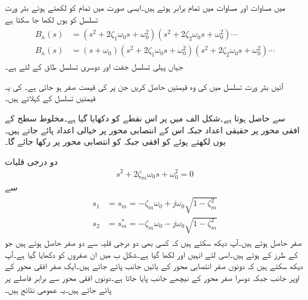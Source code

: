   میں مساوات  اور مساوات  میں تمام  برابر ہوتے ہیں۔ایسی صورت میں تمام  کو  لکھتے ہوئے بٹر ورت تسلسل کو یوں لکھا جا سکتا ہے
\begin{gather}
\begin{aligned}\label{مساوات_تعددی_ردعمل_بٹرورت_تسلسل}
B_n(s)&=\left(s^2+2 \zeta_1 \omega_0 s+\omega_0^2 \right)\left(s^2+2 \zeta_2 \omega_0 s+\omega_0^2 \right) \cdots\\
B_n(s)&=\left(s+\omega_0 \right)\left(s^2+2 \zeta_1 \omega_0 s+\omega_0^2 \right)\left(s^2+2 \zeta_2 \omega_0 s+\omega_0^2 \right) \cdots
\end{aligned}
\end{gather}
جہاں پہلی تسلسل جفت  اور دوسری تسلسل طاق  کے لئے ہے۔

آئیں بٹر ورت تسلسل میں  کی وہ قیمتیں حاصل کریں جن پر  کی قیمت صفر ہو جاتی  ہے۔ کی یہ قیمتیں تسلسل کے  کہلاتے ہیں۔

 سے  حاصل ہوتا ہے۔شکل  الف میں  پر اس نقطے کو دکھایا گیا ہے۔مخلوط سطح کے افقی محور پر حقیقی اعداد جبکہ اس کے انتصابی محور پر خیالی اعداد پائے جاتے ہیں۔یوں  لکھتے ہوئے  کو افقی جبکہ  کو انتصابی محور پر رکھا جائے گا۔

دو درجی قلیات
\begin{align}\label{مساوات_تعددی_ردعمل_دو_درجی_عمومی_جزو}
s^2+2 \zeta_m \omega_0 s +\omega_0^2=0
\end{align}
سے
\begin{gather}
\begin{aligned}
s_1&=s_m =-\zeta_m \omega_0 + j \omega_0 \sqrt{1-\zeta_m^2}\\
s_2&=s_m^* =-\zeta_m \omega_0 - j \omega_0 \sqrt{1-\zeta_m^2}
\end{aligned}
\end{gather}
صفر حاصل ہوتے ہیں۔آپ دیکھ سکتے ہیں کہ کسی بھی دو درجی قلیہ سے دو صفر حاصل ہوتے ہیں جو  کے طرز کے ہوتے ہیں۔اسی لئے انہیں  اور  لکھا گیا ہے۔شکل  ب میں ان صفروں کو دکھایا گیا ہے۔آپ دیکھ سکتے ہیں کہ دونوں صفر انتصابی محور کے بائیں جانب پائے جاتے ہیں۔ایک صفر افقی محور کے اوپر جانب جبکہ دوسرا صفر محور کے نیچھے جانب پایا جاتا ہے۔دونوں افقی محور سے برابر فاصلے پر پائے جاتے ہیں۔یہ  عمومی نتائج ہیں۔

